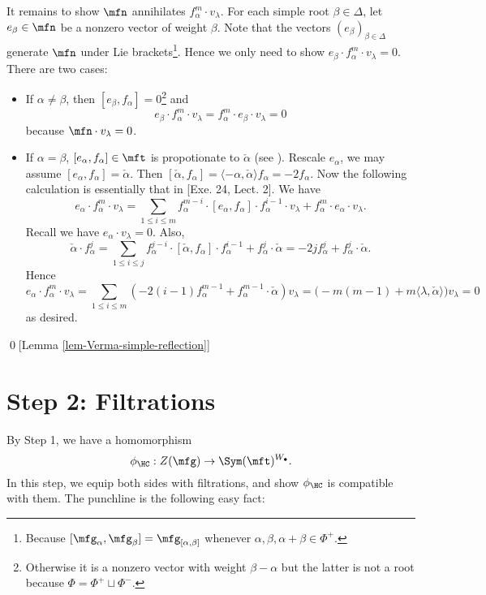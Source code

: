 		It remains to show $\mfn$ annihilates $f_\alpha^m \cdot v_\lambda$. For each simple root $\beta\in \Delta$, let $e_\beta\in \mfn$ be a nonzero vector of weight $\beta$. Note that the vectors $(e_\beta)_{\beta\in \Delta}$ generate $\mfn$ under Lie brackets\footnote{Because $[\mfg_\alpha,\mfg_\beta] = \mfg_{[\alpha,\beta]}$ whenever $\alpha,\beta,\alpha+\beta\in \Phi^+$.}. Hence we only need to show $e_\beta\cdot f_\alpha^m \cdot v_\lambda =0$. There are two cases:
		\begin{itemize}
			\item 
				If $\alpha\neq \beta$, then $[e_\beta,f_\alpha]=0$\footnote{Otherwise it is a nonzero vector with weight $\beta-\alpha$ but the latter is not a root because $\Phi = \Phi^+ \sqcup \Phi^-$.} and
				\[
					e_\beta\cdot f_\alpha^m \cdot v_\lambda = f_\alpha^m \cdot e_\beta \cdot v_\lambda = 0
				\]
				because $\mfn \cdot v_\lambda =0$.
			\item
				If $\alpha = \beta$, $[e_\alpha,f_\alpha]\in \mft$ is propotionate to $\check \alpha$ (see \cite[Prop. 8.3(d)]{H1}). Rescale $e_\alpha$, we may assume $[e_\alpha,f_\alpha ]= \check \alpha$. Then $[\check \alpha ,f_\alpha ]= \langle -\alpha,\check\alpha\rangle f_\alpha = -2f_\alpha$. Now the following calculation is essentially that in [Exe. 24, Lect. 2]. We have
				\[
					e_\alpha\cdot f_\alpha^m \cdot v_\lambda  = \sum_{1\le i\le m} f_\alpha^{m-i}\cdot [e_\alpha,f_\alpha] \cdot f_\alpha^{i-1}\cdot v_\lambda + f_\alpha^m \cdot e_\alpha \cdot v_\lambda.
				\]
				Recall we have $e_\alpha \cdot v_\lambda=0$. Also,
				\[
					\check \alpha \cdot f_\alpha^j = \sum_{1\le i\le j} f_\alpha^{j-i}\cdot [\check \alpha, f_\alpha] \cdot f_\alpha^{i-1} + f_\alpha^j  \cdot \check \alpha  = -2j f_\alpha^j +  f_\alpha^j  \cdot \check \alpha.
				\]
				Hence
				\[
					e_\alpha\cdot f_\alpha^m \cdot v_\lambda  = \sum_{1\le i\le m} (-2(i-1)f_\alpha^{m-1}+ f_\alpha^{m-1}\cdot \check\alpha ) v_\lambda = \big(-m(m-1) + m\langle \lambda,\check\alpha\rangle \big)v_\lambda = 0
				\]
				as desired.
		\end{itemize}
		
	\qed[Lemma \ref{lem-Verma-simple-reflection}]

\section{Step 2: Filtrations}
	
	By Step 1, we have a homomorphism
	\[
		\phi_\HC: Z(\mfg) \to \Sym(\mft)^{W_\bullet}.
	\]
	In this step, we equip both sides with filtrations, and show $\phi_\HC$ is compatible with them. The punchline is the following easy fact:

